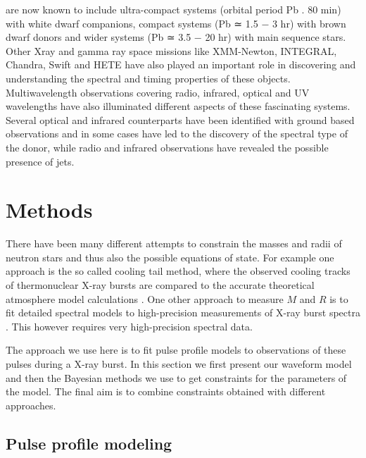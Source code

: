 \documentclass{wihuri}
\begin{document}
are now known to include ultra-compact systems (orbital period Pb . 80 min) with
white dwarf companions, compact systems (Pb ≃ 1.5 − 3 hr) with brown dwarf
donors and wider systems (Pb ≃ 3.5 − 20 hr) with main sequence stars. Other Xray
and gamma ray space missions like XMM-Newton, INTEGRAL, Chandra, Swift
and HETE have also played an important role in discovering and understanding the
spectral and timing properties of these objects. Multiwavelength observations covering
radio, infrared, optical and UV wavelengths have also illuminated different
aspects of these fascinating systems. Several optical and infrared counterparts have
been identified with ground based observations and in some cases have led to the
discovery of the spectral type of the donor, while radio and infrared observations
have revealed the possible presence of jets.

\fi

\section{Methods}

There have been many different attempts to constrain the masses and radii of neutron stars and thus also the possible equations of state. For example one approach is the so called cooling tail method, where the observed cooling tracks of thermonuclear X-ray bursts are compared to the accurate theoretical atmosphere model calculations \cite{nattila_bayes}. One other approach to measure $M$ and $R$ is to fit detailed spectral models to high-precision measurements of X-ray burst spectra \cite{madej}. %
This however requires very high-precision spectral data. 

The approach we use here is to fit pulse profile models to observations of these pulses during a X-ray burst. In this section we first present our waveform model and then the Bayesian methods we use to get constraints for the parameters of the model. The final aim is to combine constraints obtained with different approaches.

\subsection{Pulse profile modeling}
\end{document}
